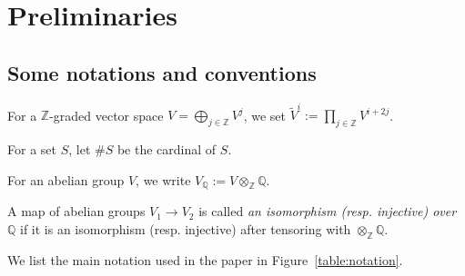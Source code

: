 \documentclass [11pt,oneside,a4paper,mathscr]{amsart}
\theoremstyle{definition}
\begin{document}
\section{Preliminaries}\label{sec:replim}
\subsection{Some notations and conventions}
For a $\mathbb{Z}$-graded vector space $V=\bigoplus_{j\in\mathbb{Z}}V^j$, we set $\widetilde{V}^i:=\prod_{j\in\mathbb{Z}}V^{i+2j}$. 

For a set $S$, let $\# S$ be the cardinal of $S$.

For an abelian group $V$, we 
write $V_{\mathbb{Q}}:=V \otimes_{\mathbb{Z}} \mathbb{Q}$. 


A map of abelian groups $V_1 \to V_2$ is
called \textit{an isomorphism (resp. injective) over $\mathbb{Q}$}
if it is an isomorphism (resp. injective) after tensoring with $\otimes_{\mathbb{Z}}\mathbb{Q}$. 

We list the main notation used in the paper in 
Figure~\ref{table:notation}. 
\end{document}
